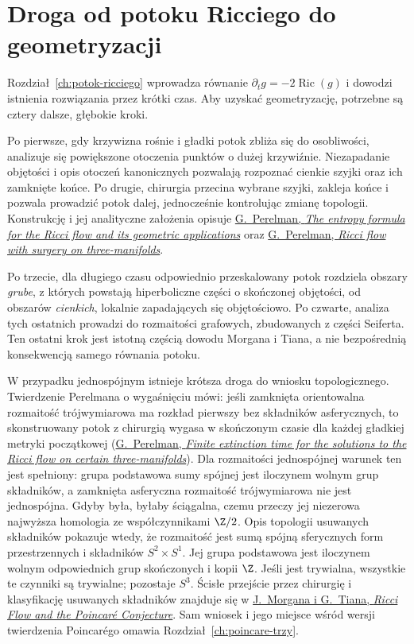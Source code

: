 \section{Droga od potoku Ricciego do geometryzacji}
\label{sec:thurston-ricci-outline}

Rozdział~\ref{ch:potok-ricciego} wprowadza równanie
$\partial_tg=-2\operatorname{Ric}(g)$ i dowodzi istnienia
rozwiązania przez krótki czas. Aby uzyskać geometryzację,
potrzebne są cztery dalsze, głębokie kroki.

Po pierwsze, gdy krzywizna rośnie i gładki potok zbliża się
do osobliwości, analizuje się powiększone otoczenia punktów
o dużej krzywiźnie. Niezapadanie objętości i opis otoczeń
kanonicznych pozwalają rozpoznać cienkie szyjki oraz ich
zamknięte końce. Po drugie, chirurgia przecina wybrane szyjki,
zakleja końce i pozwala prowadzić potok dalej, jednocześnie
kontrolując zmianę topologii. Konstrukcję i jej analityczne
założenia opisuje
\href{https://arxiv.org/pdf/math/0211159}
{G.\ Perelman, \emph{The entropy formula for the Ricci flow and
its geometric applications}} oraz
\href{https://arxiv.org/pdf/math/0303109}
{G.\ Perelman, \emph{Ricci flow with surgery on three-manifolds}}.

Po trzecie, dla długiego czasu odpowiednio przeskalowany
potok rozdziela obszary \emph{grube}, z których powstają
hiperboliczne części o skończonej objętości, od obszarów
\emph{cienkich}, lokalnie zapadających się objętościowo.
Po czwarte, analiza tych ostatnich prowadzi do rozmaitości
grafowych, zbudowanych z części Seiferta. Ten ostatni krok
jest istotną częścią dowodu Morgana i Tiana, a nie
bezpośrednią konsekwencją samego równania potoku.

W przypadku jednospójnym istnieje krótsza droga do wniosku
topologicznego. Twierdzenie Perelmana o wygaśnięciu mówi:
jeśli zamknięta orientowalna rozmaitość trójwymiarowa ma rozkład
pierwszy bez składników asferycznych, to skonstruowany
potok z chirurgią wygasa w skończonym czasie dla każdej
gładkiej metryki początkowej
(\href{https://arxiv.org/pdf/math/0307245}
{G.\ Perelman, \emph{Finite extinction time for the solutions
to the Ricci flow on certain three-manifolds}}).
Dla rozmaitości jednospójnej warunek ten jest spełniony:
grupa podstawowa sumy spójnej jest iloczynem wolnym grup
składników, a zamknięta asferyczna rozmaitość trójwymiarowa nie jest
jednospójna. Gdyby była, byłaby ściągalna, czemu przeczy
jej niezerowa najwyższa homologia ze współczynnikami $\Z/2$.
Opis topologii usuwanych składników pokazuje
wtedy, że rozmaitość jest sumą spójną sferycznych form
przestrzennych i składników $S^2\times S^1$.
Jej grupa podstawowa jest iloczynem wolnym odpowiednich
grup skończonych i kopii $\Z$. Jeśli jest trywialna,
wszystkie te czynniki są trywialne; pozostaje $S^3$.
Ścisłe przejście przez chirurgię i klasyfikację usuwanych
składników znajduje się w
\href{https://www.claymath.org/wp-content/uploads/2022/03/Ricci-pdf.pdf}
{J.\ Morgana i G.\ Tiana, \emph{Ricci Flow and the Poincaré
Conjecture}}. Sam wniosek i jego miejsce wśród wersji
twierdzenia Poincarégo omawia Rozdział~\ref{ch:poincare-trzy}.

